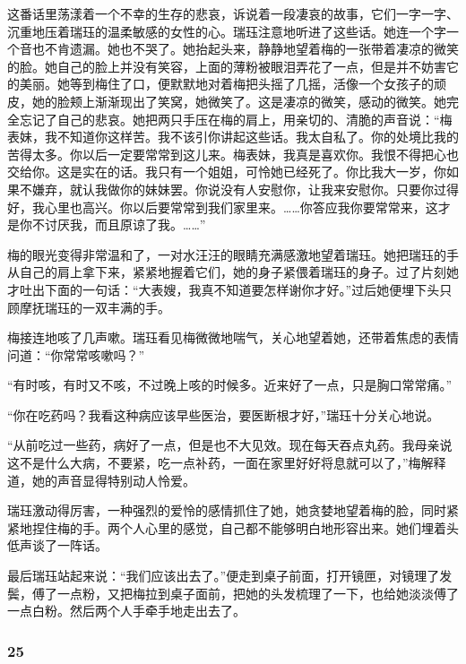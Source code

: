 \par 这番话里荡漾着一个不幸的生存的悲哀，诉说着一段凄哀的故事，它们一字一字、沉重地压着瑞珏的温柔敏感的女性的心。瑞珏注意地听进了这些话。她连一个字一个音也不肯遗漏。她也不哭了。她抬起头来，静静地望着梅的一张带着凄凉的微笑的脸。她自己的脸上并没有笑容，上面的薄粉被眼泪弄花了一点，但是并不妨害它的美丽。她等到梅住了口，便默默地对着梅把头摇了几摇，活像一个女孩子的顽皮，她的脸颊上渐渐现出了笑窝，她微笑了。这是凄凉的微笑，感动的微笑。她完全忘记了自己的悲哀。她把两只手压在梅的肩上，用亲切的、清脆的声音说：“梅表妹，我不知道你这样苦。我不该引你讲起这些话。我太自私了。你的处境比我的苦得太多。你以后一定要常常到这儿来。梅表妹，我真是喜欢你。我恨不得把心也交给你。这是实在的话。我只有一个姐姐，可怜她已经死了。你比我大一岁，你如果不嫌弃，就认我做你的妹妹罢。你说没有人安慰你，让我来安慰你。只要你过得好，我心里也高兴。你以后要常常到我们家里来。……你答应我你要常常来，这才是你不讨厌我，而且原谅了我。……”
\par 梅的眼光变得非常温和了，一对水汪汪的眼睛充满感激地望着瑞珏。她把瑞珏的手从自己的肩上拿下来，紧紧地握着它们，她的身子紧偎着瑞珏的身子。过了片刻她才吐出下面的一句话：“大表嫂，我真不知道要怎样谢你才好。”过后她便埋下头只顾摩抚瑞珏的一双丰满的手。
\par 梅接连地咳了几声嗽。瑞珏看见梅微微地喘气，关心地望着她，还带着焦虑的表情问道：“你常常咳嗽吗？”
\par “有时咳，有时又不咳，不过晚上咳的时候多。近来好了一点，只是胸口常常痛。”
\par “你在吃药吗？我看这种病应该早些医治，要医断根才好，”瑞珏十分关心地说。
\par “从前吃过一些药，病好了一点，但是也不大见效。现在每天吞点丸药。我母亲说这不是什么大病，不要紧，吃一点补药，一面在家里好好将息就可以了，”梅解释道，她的声音显得特别动人怜爱。
\par 瑞珏激动得厉害，一种强烈的爱怜的感情抓住了她，她贪婪地望着梅的脸，同时紧紧地捏住梅的手。两个人心里的感觉，自己都不能够明白地形容出来。她们埋着头低声谈了一阵话。
\par 最后瑞珏站起来说：“我们应该出去了。”便走到桌子前面，打开镜匣，对镜理了发鬓，傅了一点粉，又把梅拉到桌子面前，把她的头发梳理了一下，也给她淡淡傅了一点白粉。然后两个人手牵手地走出去了。



\subsubsection*{25}

